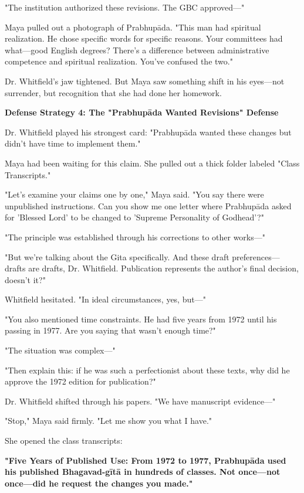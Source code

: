\documentclass[12pt,twoside]{book}
\begin{document}
"The institution authorized these revisions. The GBC approved—"

Maya pulled out a photograph of Prabhupāda. "This man had spiritual realization. He chose specific words for specific reasons. Your committees had what—good English degrees? There's a difference between administrative competence and spiritual realization. You've confused the two."

Dr. Whitfield's jaw tightened. But Maya saw something shift in his eyes—not surrender, but recognition that she had done her homework.


\vspace{0.5cm}
\textbf{Defense Strategy 4: The "Prabhupāda Wanted Revisions" Defense}
\vspace{0.2cm}


Dr. Whitfield played his strongest card: "Prabhupāda wanted these changes but didn't have time to implement them."

Maya had been waiting for this claim. She pulled out a thick folder labeled "Class Transcripts."

"Let's examine your claims one by one," Maya said. "You say there were unpublished instructions. Can you show me one letter where Prabhupāda asked for 'Blessed Lord' to be changed to 'Supreme Personality of Godhead'?"

"The principle was established through his corrections to other works—"

"But we're talking about the Gita specifically. And these draft preferences—drafts are drafts, Dr. Whitfield. Publication represents the author's final decision, doesn't it?"

Whitfield hesitated. "In ideal circumstances, yes, but—"

"You also mentioned time constraints. He had five years from 1972 until his passing in 1977. Are you saying that wasn't enough time?"

"The situation was complex—"

"Then explain this: if he was such a perfectionist about these texts, why did he approve the 1972 edition for publication?"

Dr. Whitfield shifted through his papers. "We have manuscript evidence—"

"Stop," Maya said firmly. "Let me show you what I have."

She opened the class transcripts:

\textbf{\textbf{"Five Years of Published Use: From 1972 to 1977, Prabhupāda used his published Bhagavad-gītā in hundreds of classes. Not once—not once—did he request the changes you made."}}
\end{document}
